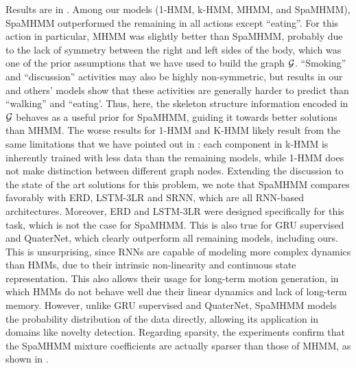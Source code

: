 Results are in . Among our models (1-HMM, k-HMM, MHMM, and Spa\allowbreak MHMM), SpaMHMM outperformed the remaining in all actions except ``eating''. For this action in particular, MHMM was slightly better than SpaMHMM, probably due to the lack of symmetry between the right and left sides of the body, which was one of the prior assumptions that we have used to build the graph ${\mathcal{G}}$. ``Smoking'' and ``discussion'' activities may also be highly non-symmetric, but results in our and others' models show that these activities are generally harder to predict than ``walking'' and ``eating'. Thus, here, the skeleton structure information encoded in ${\mathcal{G}}$ behaves as a useful prior for SpaMHMM, guiding it towards better solutions than MHMM. The worse results for 1-HMM and K-HMM likely result from the same limitations that we have pointed out in : each component in k-HMM is inherently trained with less data than the remaining models, while 1-HMM does not make distinction between different graph nodes. Extending the discussion to the state of the art solutions for this problem, we note that SpaMHMM compares favorably with ERD, LSTM-3LR and SRNN, which are all RNN-based architectures. Moreover, ERD and LSTM-3LR were designed specifically for this task, which is not the case for SpaMHMM. This is also true for GRU supervised and QuaterNet, which clearly outperform all remaining models, including ours. This is unsurprising, since RNNs are capable of modeling more complex dynamics than HMMs, due to their intrinsic non-linearity and continuous state representation. This also allows their usage for long-term motion generation, in which HMMs do not behave well due their linear dynamics and lack of long-term memory. However, unlike GRU supervised and QuaterNet, SpaMHMM  models the probability distribution of the data directly, allowing its application in domains like novelty detection. Regarding sparsity, the experiments confirm that the SpaMHMM mixture coefficients are actually sparser than those of MHMM, as shown in .

